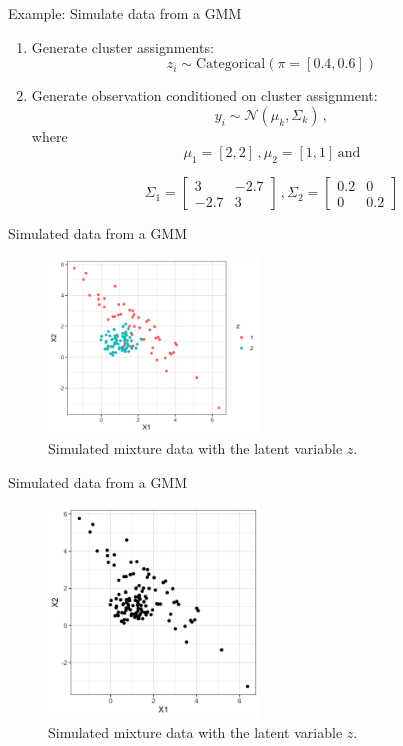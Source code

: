 \documentclass[10pt]{beamer}
\begin{document}
\begin{frame}{Example: Simulate data from a GMM}

\begin{enumerate}
\item Generate cluster assignments:
\[
z_i \sim \text{Categorical}(\pi = [0.4, 0.6])
\]
\item Generate observation conditioned on cluster assignment:
\[
y_i \sim \mathcal{N}(\mu_k, \Sigma_k)\,,
\]
where
\[
\mu_1 = [2, 2]\,, \mu_2 = [1, 1]\, \text{and}
\]

\[
\Sigma_1 = \begin{bmatrix} 3 & -2.7\\ -2.7 & 3 \end{bmatrix}\,,\Sigma_2 = \begin{bmatrix} 0.2 & 0\\ 0 & 0.2 \end{bmatrix}
\]

\end{enumerate}

\end{frame}


\begin{frame}{Simulated data from a GMM}

\begin{figure}[h]
\centering
\includegraphics[width=0.5\textwidth]{fig/mix_models_z.png}
\caption{Simulated mixture data with the latent variable $z$.}
\end{figure}

\end{frame}

\begin{frame}{Simulated data from a GMM}

\begin{figure}[h]
\centering
\includegraphics[width=0.5\textwidth]{fig/mix_models.png}
\caption{Simulated mixture data with the latent variable $z$.}
\end{figure}

\end{frame}
\end{document}
